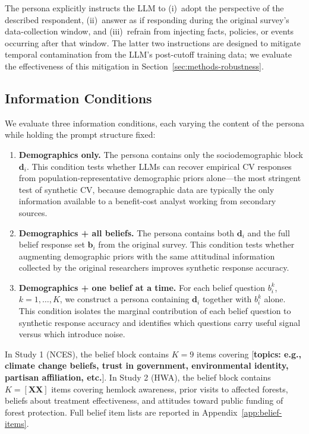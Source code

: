 \documentclass[12pt]{article}
\begin{document}
The persona explicitly instructs the LLM to (i)~adopt the perspective of the described respondent, (ii)~answer as if responding during the original survey's data-collection window, and (iii)~refrain from injecting facts, policies, or events occurring after that window. The latter two instructions are designed to mitigate temporal contamination from the LLM's post-cutoff training data; we evaluate the effectiveness of this mitigation in Section~\ref{sec:methods-robustness}.

\subsection{Information Conditions}\label{sec:methods-conditions}

We evaluate three information conditions, each varying the content of the persona while holding the prompt structure fixed:

\begin{enumerate}
    \item \textbf{Demographics only.} The persona contains only the sociodemographic block $\mathbf{d}_i$. This condition tests whether LLMs can recover empirical CV responses from population-representative demographic priors alone---the most stringent test of synthetic CV, because demographic data are typically the only information available to a benefit-cost analyst working from secondary sources.
    \item \textbf{Demographics + all beliefs.} The persona contains both $\mathbf{d}_i$ and the full belief response set $\mathbf{b}_i$ from the original survey. This condition tests whether augmenting demographic priors with the same attitudinal information collected by the original researchers improves synthetic response accuracy.
    \item \textbf{Demographics + one belief at a time.} For each belief question $b_i^k$, $k = 1, \dots, K$, we construct a persona containing $\mathbf{d}_i$ together with $b_i^k$ alone. This condition isolates the marginal contribution of each belief question to synthetic response accuracy and identifies which questions carry useful signal versus which introduce noise.
\end{enumerate}

In Study 1 (NCES), the belief block contains $K = 9$ items covering [\textbf{topics: e.g., climate change beliefs, trust in government, environmental identity, partisan affiliation, etc.}]. In Study 2 (HWA), the belief block contains $K = [\textbf{XX}]$ items covering hemlock awareness, prior visits to affected forests, beliefs about treatment effectiveness, and attitudes toward public funding of forest protection. Full belief item lists are reported in Appendix~\ref{app:belief-items}.
\end{document}

